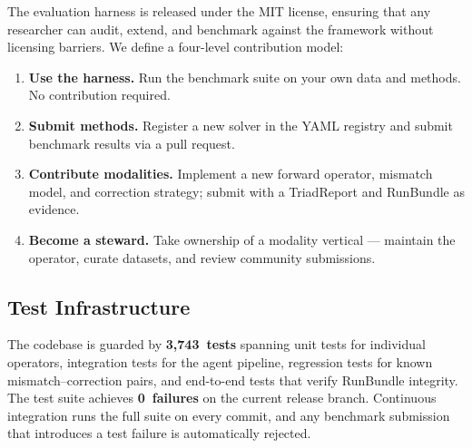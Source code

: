 The \pwm{} evaluation harness is released under the MIT license,
ensuring that any researcher can audit, extend, and benchmark against
the framework without licensing barriers.  We define a four-level
contribution model:
%
\begin{enumerate}
    \item \textbf{Use the harness.}  Run the benchmark suite on your own
          data and methods.  No contribution required.
    \item \textbf{Submit methods.}  Register a new solver in the YAML
          registry and submit benchmark results via a pull request.
    \item \textbf{Contribute modalities.}  Implement a new forward
          operator, mismatch model, and correction strategy; submit with
          a TriadReport and RunBundle as evidence.
    \item \textbf{Become a steward.}  Take ownership of a modality
          vertical --- maintain the operator, curate datasets, and
          review community submissions.
\end{enumerate}

\subsection{Test Infrastructure}

The \pwm{} codebase is guarded by \textbf{3,743~tests} spanning unit
tests for individual operators, integration tests for the agent
pipeline, regression tests for known mismatch--correction pairs, and
end-to-end tests that verify RunBundle integrity.  The test suite
achieves \textbf{0~failures} on the current release branch.  Continuous
integration runs the full suite on every commit, and any benchmark
submission that introduces a test failure is automatically rejected.
